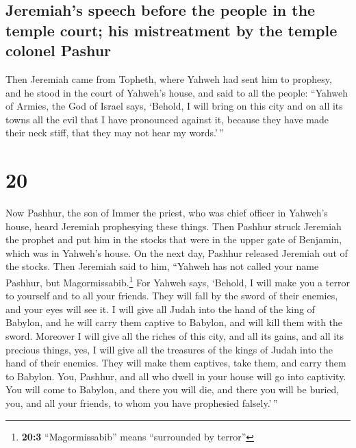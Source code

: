 \hypertarget{jeremiahs-speech-before-the-people-in-the-temple-court-his-mistreatment-by-the-temple-colonel-pashur}{%
\subsection{Jeremiah's speech before the people in the temple court; his
mistreatment by the temple colonel
Pashur}\label{jeremiahs-speech-before-the-people-in-the-temple-court-his-mistreatment-by-the-temple-colonel-pashur}}

 Then Jeremiah came from Topheth, where Yahweh had sent
him to prophesy, and he stood in the court of Yahweh's house, and said
to all the people:  ``Yahweh of Armies, the God of Israel
says, `Behold, I will bring on this city and on all its towns all the
evil that I have pronounced against it, because they have made their
neck stiff, that they may not hear my words.'\,''

\hypertarget{section-19}{%
\section{20}\label{section-19}}

 Now Pashhur, the son of Immer the priest, who was chief
officer in Yahweh's house, heard Jeremiah prophesying these things.
 Then Pashhur struck Jeremiah the prophet and put him in
the stocks that were in the upper gate of Benjamin, which was in
Yahweh's house.  On the next day, Pashhur released
Jeremiah out of the stocks. Then Jeremiah said to him, ``Yahweh has not
called your name Pashhur, but Magormissabib.\footnote{\textbf{20:3}
  ``Magormissabib'' means ``surrounded by terror''}  For
Yahweh says, `Behold, I will make you a terror to yourself and to all
your friends. They will fall by the sword of their enemies, and your
eyes will see it. I will give all Judah into the hand of the king of
Babylon, and he will carry them captive to Babylon, and will kill them
with the sword.  Moreover I will give all the riches of
this city, and all its gains, and all its precious things, yes, I will
give all the treasures of the kings of Judah into the hand of their
enemies. They will make them captives, take them, and carry them to
Babylon.  You, Pashhur, and all who dwell in your house
will go into captivity. You will come to Babylon, and there you will
die, and there you will be buried, you, and all your friends, to whom
you have prophesied falsely.'\,''

